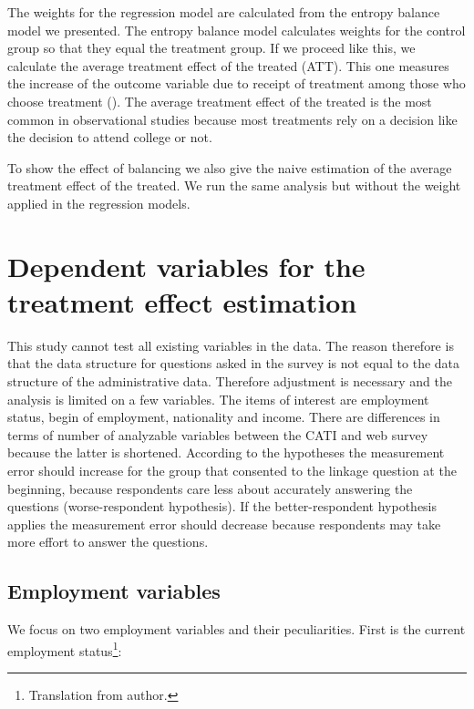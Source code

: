 The weights for the regression model are calculated from the entropy balance model we presented. The entropy balance model calculates weights for the control group so that they equal the treatment group. If we proceed like this, we calculate the average treatment effect of the treated (ATT). This one measures the increase of the outcome variable due to receipt of treatment among those who choose treatment (\cite{Eckmanetal15}). The average treatment effect of the treated is the most common in observational studies because most treatments rely on a decision like the decision to attend college or not.

To show the effect of balancing we also give the naive estimation of the average treatment effect of the treated. We run the same analysis but without the weight applied in the regression models.

\section{Dependent variables for the treatment effect estimation}\label{variables}

This study cannot test all existing variables in the data. The reason therefore is that the data structure for questions asked in the survey is not equal to the data structure of the administrative data. Therefore adjustment is necessary and the analysis is limited on a few variables. The items of interest are employment status, begin of employment, nationality and income. There are differences in terms of number of analyzable variables between the CATI and web survey because the latter is shortened. According to the hypotheses the measurement error should increase for the group that consented to the linkage question at the beginning, because respondents care less about accurately answering the questions (worse-respondent hypothesis). If the better-respondent hypothesis applies the measurement error should decrease because respondents may take more effort to answer the questions.

\subsection{Employment variables}

We focus on two employment variables and their peculiarities. First is the current employment status\footnote{Translation from author.}:

